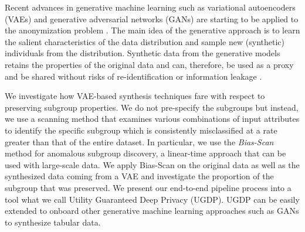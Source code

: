 \documentclass[dvipdft]{article}
\begin{document}

Recent advances in generative machine learning such as variational autoencoders (VAEs) and generative adversarial networks (GANs) are starting to be applied to the anonymization problem \cite{LouizosSLWZ2016, EdwardsS2016, park2018data, bryant2019fairness, Bae, Hakon, Ainsworth}. The main idea of the generative approach is to learn the salient characteristics of the data distribution and sample new (synthetic) individuals from the distribution. Synthetic data from the generative models retains the properties of the original data and can, therefore, be used as a proxy and be shared without risks of re-identification or information leakage \cite{park2018data}.  

We investigate how VAE-based synthesis techniques fare with respect to preserving subgroup properties. We do not pre-specify the subgroups but instead, we use a scanning method that examines various combinations of input attributes to identify the specific subgroup which is consistently misclassified at a rate greater than that of the entire dataset. In particular, we use the \textit{Bias-Scan} method \cite{zhang2017} for anomalous subgroup discovery, a linear-time approach that can be used with large-scale data. We apply Bias-Scan on the original data as well as the synthesized data coming from a VAE and investigate the proportion of the subgroup that was preserved. 
We present our end-to-end pipeline process into a tool what we call Utility Guaranteed Deep Privacy (UGDP).  UGDP can be easily extended to onboard other generative machine learning 
approaches such as GANs to synthesize tabular data. 

 
\end{document}
